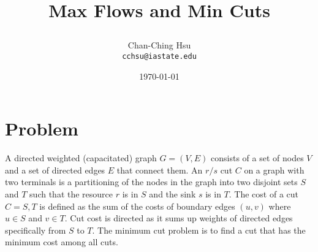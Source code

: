 \documentclass[11pt]{article}
\begin{document}
\thispagestyle{empty}
\title{\begin{center}
\textbf{
\Large Max Flows and Min Cuts
}
\end{center}}
\author{
Chan-Ching Hsu\\
\texttt{cchsu@iastate.edu}
}
\date{\today}
\maketitle
\section{Problem}
A directed weighted (capacitated) graph $G=(V,E)$ consists of a set of nodes $V$ and a set of directed edges $E$ that connect them. An $r/s$ cut $C$ on a graph with two terminals is a partitioning of the nodes in the graph into two disjoint sets $S$ and $T$ such that the resource $r$ is in $S$ and the sink $s$ is in $T$. The cost of a cut $C={S,T}$ is defined as the sum of the costs of boundary edges $(u,v)$ where $u\in S$ and $v\in T$. Cut cost is directed as it sums up weights of directed edges specifically from $S$ to $T$. The minimum cut problem is to find a cut that has the minimum cost among all cuts.
\end{document}

